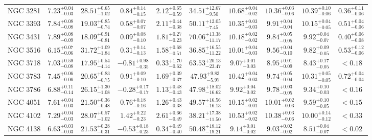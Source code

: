\documentclass[onecolumn]{mn2e}
\begin{document}
\begin{landscape}
{\begin{center}
\begin{longtable}{lccccccccc}
NGC 3281 & $7.23_{-0.03}^{+0.04}$ & $28.51_{-1.02}^{+0.65}$ & $0.84_{-0.15}^{+0.14}$ & $2.12_{-0.59}^{+0.65}$ &$34.51_{-9.50}^{+12.67}$ & $10.68_{-0.02}^{+0.04}$ & $10.36_{-0.06}^{+0.03}$ & $10.39_{-0.06}^{+0.10}$ & $0.36_{-0.06}^{+0.11}$ \\
NGC 3393 & $7.84_{-0.08}^{+0.08}$ & $19.03_{-0.74}^{+0.85}$ & $0.58_{-0.07}^{+0.07}$ & $2.11_{-0.38}^{+0.44}$ &$50.11_{-7.45}^{+12.05}$ & $10.35_{-0.03}^{+0.03}$ & $9.91_{-0.04}^{+0.04}$ & $10.15_{-0.05}^{+0.04}$ & $0.51_{-0.06}^{+0.04}$ \\
NGC 3431 & $7.89_{-0.09}^{+0.08}$ & $18.09_{-0.81}^{+0.91}$ & $0.09_{-0.10}^{+0.08}$ & $1.81_{-0.23}^{+0.27}$ &$70.06_{-11.17}^{+13.38}$ & $10.18_{-0.02}^{+0.02}$ & $9.84_{-0.05}^{+0.05}$ & $9.92_{-0.07}^{+0.04}$ & $0.40_{-0.08}^{+0.06}$ \\
NGC 3516 & $6.15_{-0.06}^{+0.07}$ & $31.72_{-1.84}^{+1.09}$ & $0.31_{-0.13}^{+0.14}$ & $1.58_{-0.51}^{+0.68}$ &$36.85_{-11.22}^{+16.55}$ & $10.01_{-0.03}^{+0.04}$ & $9.56_{-0.10}^{+0.04}$ & $9.82_{-0.05}^{+0.09}$ & $0.53_{-0.06}^{+0.12}$ \\
NGC 3718 & $7.03_{-0.08}^{+0.59}$ & $17.95_{-4.14}^{+0.54}$ & $-0.81_{-0.35}^{+0.98}$ & $0.33_{-0.62}^{+1.70}$ &$63.53_{-23.47}^{+20.13}$ & $9.07_{-0.03}^{+0.01}$ & $8.95_{-0.09}^{+0.01}$ & $8.43_{-0.05}^{+0.17}$ & $<0.18$ \\
NGC 3783 & $7.45_{-0.06}^{+0.06}$ & $20.65_{-0.75}^{+0.83}$ & $0.91_{-0.10}^{+0.09}$ & $1.69_{-0.37}^{+0.39}$ &$47.93_{-5.97}^{+9.83}$ & $10.42_{-0.03}^{+0.04}$ & $9.74_{-0.04}^{+0.05}$ & $10.31_{-0.05}^{+0.05}$ & $0.72_{-0.04}^{+0.04}$ \\
NGC 3786 & $6.88_{-0.14}^{+0.11}$ & $26.15_{-1.08}^{+1.30}$ & $-0.28_{-0.17}^{+0.17}$ & $1.13_{-0.43}^{+0.48}$ &$47.98_{-16.62}^{+18.02}$ & $9.92_{-0.02}^{+0.04}$ & $9.78_{-0.05}^{+0.03}$ & $9.34_{-0.03}^{+0.10}$ & $<0.16$ \\
NGC 4051 & $7.61_{-0.03}^{+0.04}$ & $21.50_{-0.48}^{+0.36}$ & $0.76_{-0.16}^{+0.18}$ & $1.26_{-0.38}^{+0.43}$ &$49.57_{-16.13}^{+16.56}$ & $10.15_{-0.01}^{+0.02}$ & $10.01_{-0.03}^{+0.02}$ & $9.59_{-0.05}^{+0.10}$ & $<0.15$ \\
NGC 4102 & $7.29_{-0.03}^{+0.04}$ & $28.07_{-1.02}^{+0.57}$ & $1.42_{-0.23}^{+0.22}$ & $2.61_{-0.49}^{+0.66}$ &$38.21_{-11.50}^{+17.38}$ & $10.53_{-0.02}^{+0.02}$ & $10.38_{-0.06}^{+0.03}$ & $10.00_{-0.12}^{+0.14}$ & $<0.33$ \\
NGC 4138 & $6.63_{-0.03}^{+0.03}$ & $21.53_{-0.31}^{+0.28}$ & $-0.53_{-0.23}^{+0.18}$ & $0.34_{-0.40}^{+0.49}$ &$50.48_{-19.21}^{+18.12}$ & $9.14_{-0.02}^{+0.01}$ & $9.03_{-0.02}^{+0.02}$ & $8.51_{-0.07}^{+0.04}$ & $<0.02$ \\

\end{longtable}
\end{center}}
\end{landscape}
\end{document}
